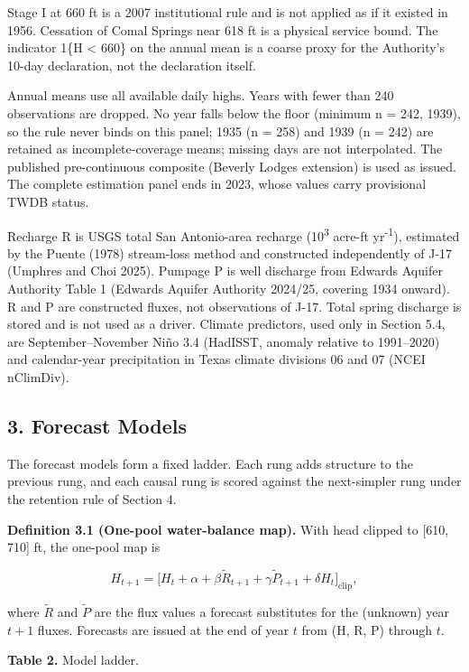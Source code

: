 \documentclass[11pt]{article}
\begin{document}
Stage I at 660 ft is a 2007 institutional rule and is not applied as if
it existed in 1956. Cessation of Comal Springs near 618 ft is a physical
service bound. The indicator 1\{H \textless{} 660\} on the annual mean
is a coarse proxy for the Authority's 10-day declaration, not the
declaration itself.

Annual means use all available daily highs. Years with fewer than 240
observations are dropped. No year falls below the floor (minimum n =
242, 1939), so the rule never binds on this panel; 1935 (n = 258) and
1939 (n = 242) are retained as incomplete-coverage means; missing days
are not interpolated. The published pre-continuous composite (Beverly
Lodges extension) is used as issued. The complete estimation panel ends
in 2023, whose values carry provisional TWDB status.

Recharge R is USGS total San Antonio-area recharge (10\textsuperscript{3} acre-ft yr\textsuperscript{-1}),
estimated by the Puente (1978) stream-loss method and constructed
independently of J-17 (Umphres and Choi 2025). Pumpage P is well
discharge from Edwards Aquifer Authority Table 1 (Edwards Aquifer
Authority 2024/25, covering 1934 onward). R and P are constructed
fluxes, not observations of J-17. Total spring discharge is stored and
is not used as a driver. Climate predictors, used only in Section 5.4,
are September--November Ni\~no 3.4 (HadISST, anomaly relative to
1991--2020) and calendar-year precipitation in Texas climate divisions
06 and 07 (NCEI nClimDiv).

\subsection{3. Forecast Models}\label{edw-forecast-models}

The forecast models form a fixed ladder. Each rung adds structure to the
previous rung, and each causal rung is scored against the next-simpler
rung under the retention rule of Section 4.

\textbf{Definition 3.1 (One-pool water-balance map).} With head clipped
to {[}610, 710{]} ft, the one-pool map is

\[H_{t+1}=\bigl[H_t+\alpha+\beta\tilde R_{t+1}+\gamma\tilde P_{t+1}+\delta H_t\bigr]_{\mathrm{clip}},\]

where \(\tilde R\) and \(\tilde P\) are the flux values a forecast
substitutes for the (unknown) year \(t+1\) fluxes. Forecasts are issued
at the end of year \(t\) from (H, R, P) through \(t\).

\textbf{Table 2.} Model ladder.
\end{document}
